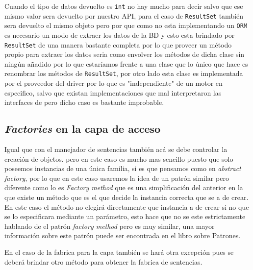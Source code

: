Cuando el tipo de datos devuelto es \verb=int= no hay mucho para decir salvo que ese mismo valor sera devuelto por nuestro API, para el caso de \verb=ResultSet= también sera devuelto el mismo objeto pero por que como \jj no esta implementando un \verb=ORM= es necesario un modo de extraer los datos de la BD y esto esta brindado por \verb=ResultSet= de una manera bastante completa por lo que proveer un método propio para extraer los datos seria como envolver los métodos de dicha clase sin ningún añadido por lo que estaríamos frente a una clase que lo único que hace es renombrar los métodos de \verb=ResultSet=, por otro lado esta clase es implementada por el proveedor del driver por lo que es "independiente" de un motor en especifico, salvo que existan implementaciones que mal interpretaron las interfaces de \jd pero dicho caso es bastante improbable.
%
\subsection{\textit{Factories} en la capa de acceso}
Igual que con el manejador de sentencias también acá se debe controlar la creación de objetos. pero en este caso es mucho mas sencillo puesto que solo poseemos instancias de una única familia, si es que pensamos como en \textit{abstract factory}, por lo que en este caso usaremos la idea de un patrón similar pero diferente como lo es \textit{Factory method} que es una simplificación del anterior en la que existe un método que es el que decide la instancia correcta que se a de crear. En este caso el método no elegirá directamente que instancia a de crear si no que se lo especificara mediante un parámetro, esto hace que no se este estrictamente hablando de el patrón \textit{factory method} pero es muy similar, una mayor información sobre este patrón puede ser encontrada en el libro sobre Patrones\citep{Metsker:2002:DPJ}. 

En el caso de la fabrica para la capa también se hará otra excepción pues se deberá brindar otro método para obtener la fabrica de sentencias.